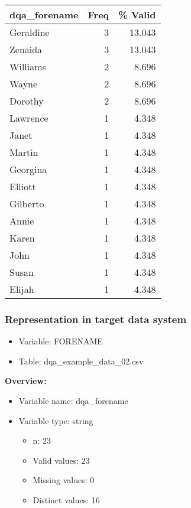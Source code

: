 \documentclass[
]{article}
\providecommand{\tightlist}{%
  \setlength{\itemsep}{0pt}\setlength{\parskip}{0pt}}
\begin{document}
\begin{table}[H]
\centering
\begin{tabular}{l|r|r}
\hline
\textbf{dqa\_forename} & \textbf{Freq} & \textbf{\% Valid}\\
\hline
Geraldine & 3 & 13.043\\
\hline
Zenaida & 3 & 13.043\\
\hline
Williams & 2 & 8.696\\
\hline
Wayne & 2 & 8.696\\
\hline
Dorothy & 2 & 8.696\\
\hline
Lawrence & 1 & 4.348\\
\hline
Janet & 1 & 4.348\\
\hline
Martin & 1 & 4.348\\
\hline
Georgina & 1 & 4.348\\
\hline
Elliott & 1 & 4.348\\
\hline
Gilberto & 1 & 4.348\\
\hline
Annie & 1 & 4.348\\
\hline
Karen & 1 & 4.348\\
\hline
John & 1 & 4.348\\
\hline
Susan & 1 & 4.348\\
\hline
Elijah & 1 & 4.348\\
\hline
\end{tabular}
\end{table}
\newpage

\hypertarget{representation-in-target-data-system-6}{%
\subsubsection{\texorpdfstring{Representation in \textbf{target} data
system}{Representation in target data system}}\label{representation-in-target-data-system-6}}

\begin{itemize}
\tightlist
\item
  Variable: FORENAME
\item
  Table: dqa\_example\_data\_02.csv
\end{itemize}

\textbf{Overview:}

\begin{itemize}
\tightlist
\item
  Variable name: dqa\_forename
\item
  Variable type: string

  \begin{itemize}
  \tightlist
  \item
    n: 23
  \item
    Valid values: 23
  \item
    Missing values: 0
  \item
    Distinct values: 16
  \end{itemize}
\end{itemize}
\end{document}
